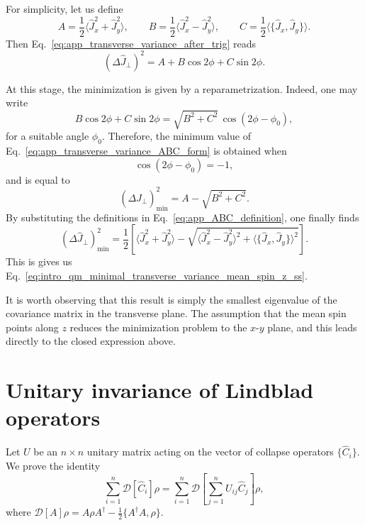 For simplicity, let us define
\begin{equation}
	A=\frac{1}{2}\langle \hat J_x^2+\hat J_y^2\rangle,
	\qquad
	B=\frac{1}{2}\langle \hat J_x^2-\hat J_y^2\rangle,
	\qquad
	C=\frac{1}{2}\langle \{\hat J_x,\hat J_y\} \rangle.
	\label{eq:app_ABC_definition}
\end{equation}
Then Eq.~\eqref{eq:app_transverse_variance_after_trig} reads
\begin{equation}
	(\Delta \hat J_\perp)^2 = A + B \cos 2\phi + C \sin 2\phi.
	\label{eq:app_transverse_variance_ABC_form}
\end{equation}

At this stage, the minimization is given by a reparametrization. Indeed, one may write
\begin{equation}
	B \cos 2\phi + C \sin 2\phi
	=
	\sqrt{B^2+C^2}\,\cos(2\phi-\phi_0),
	\label{eq:app_trig_reduction}
\end{equation}
for a suitable angle \(\phi_0\). Therefore, the minimum value of Eq.~\eqref{eq:app_transverse_variance_ABC_form} is obtained when
\begin{equation}
	\cos(2\phi-\phi_0)=-1,
	\label{eq:app_condition_for_minimum}
\end{equation}
and is equal to
\begin{equation}
	(\Delta \hat J_\perp)^2_{\min}=A-\sqrt{B^2+C^2}.
	\label{eq:app_minimum_transverse_variance_ABC}
\end{equation}
By substituting the definitions in Eq.~\eqref{eq:app_ABC_definition}, one finally finds
\begin{equation}
	(\Delta \hat J_\perp)^2_{\min}
	=
	\frac{1}{2}
	\left[
	\langle \hat J_x^2+\hat J_y^2\rangle
	-
	\sqrt{
		\langle \hat J_x^2-\hat J_y^2\rangle^2
		+
		\langle \{\hat J_x,\hat J_y\}\rangle^2
	}
	\right].
	\label{eq:app_final_minimal_transverse_variance}
\end{equation}
This is gives us Eq.~\eqref{eq:intro_qm_minimal_transverse_variance_mean_spin_z_ss}.

It is worth observing that this result is simply the smallest eigenvalue of the covariance matrix in the transverse plane. The assumption that the mean spin points along \(z\) reduces the minimization problem to the \(x\)-\(y\) plane, and this leads directly to the closed expression above.

\newpage 

\section*{Unitary invariance of Lindblad operators}
\label{app:unitary_invariance_of_Lindblad_operators}
Let $U$ be an $n\times n$ unitary matrix acting on the vector of collapse operators $\{\hat C_i\}$.
We prove the identity
\begin{equation}
	\sum_{i=1}^{n}\mathcal{D}[\hat C_i]\rho
	=
	\sum_{i=1}^{n}\mathcal{D}\!\left[\sum_{j=1}^{n}U_{ij}\hat C_j\right]\rho,
	\label{eq:unitary_invariance_dissipator}
\end{equation}
where $\mathcal{D}[A]\rho=A\rho A^\dagger-\tfrac{1}{2}\{A^\dagger A,\rho\}$.

